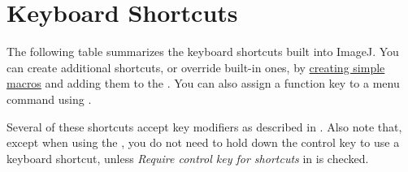 
\part{Keyboard Shortcuts\label{sec:Keyboard-Shortcuts}}

The following table summarizes the keyboard shortcuts
built into ImageJ. You can create additional shortcuts, or override
built-in ones, by \href{http://imagej.nih.gov/ij/developer/macro/macros.html\#shortcuts}{creating simple macros}
and adding them to the . You can also
assign a function key to a menu command using \textsf{}. 

Several of these shortcuts accept key modifiers as described in .
Also note that, except when using the , you
do not need to hold down the control key to use a keyboard shortcut,
unless \emph{Require control key for shortcuts }in \textsf{}
is checked.



\begingroup
\small
\renewcommand{\tabcolsep}{4pt}%
\renewcommand\arraystretch{1.08} %

